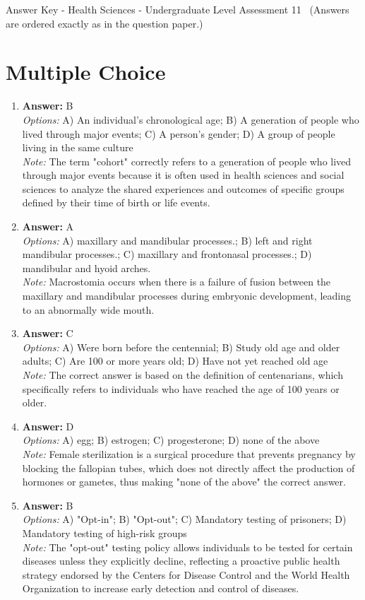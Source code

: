 \documentclass[12pt]{article}
\begin{document}
\begin{center}
Answer Key - Health Sciences - Undergraduate Level Assessment 11 \
\small (Answers are ordered exactly as in the question paper.)
\end{center}

\section*{Multiple Choice}
\begin{enumerate}[label=\arabic*.]
\item \textbf{Answer:} B
\\ \textit{Options:} A) An individual's chronological age; B) A generation of people who lived through major events; C) A person's gender; D) A group of people living in the same culture
\\ \textit{Note:} The term "cohort" correctly refers to a generation of people who lived through major events because it is often used in health sciences and social sciences to analyze the shared experiences and outcomes of specific groups defined by their time of birth or life events.
\item \textbf{Answer:} A
\\ \textit{Options:} A) maxillary and mandibular processes.; B) left and right mandibular processes.; C) maxillary and frontonasal processes.; D) mandibular and hyoid arches.
\\ \textit{Note:} Macrostomia occurs when there is a failure of fusion between the maxillary and mandibular processes during embryonic development, leading to an abnormally wide mouth.
\item \textbf{Answer:} C
\\ \textit{Options:} A) Were born before the centennial; B) Study old age and older adults; C) Are 100 or more years old; D) Have not yet reached old age
\\ \textit{Note:} The correct answer is based on the definition of centenarians, which specifically refers to individuals who have reached the age of 100 years or older.
\item \textbf{Answer:} D
\\ \textit{Options:} A) egg; B) estrogen; C) progesterone; D) none of the above
\\ \textit{Note:} Female sterilization is a surgical procedure that prevents pregnancy by blocking the fallopian tubes, which does not directly affect the production of hormones or gametes, thus making "none of the above" the correct answer.
\item \textbf{Answer:} B
\\ \textit{Options:} A) "Opt-in"; B) "Opt-out"; C) Mandatory testing of prisoners; D) Mandatory testing of high-risk groups
\\ \textit{Note:} The "opt-out" testing policy allows individuals to be tested for certain diseases unless they explicitly decline, reflecting a proactive public health strategy endorsed by the Centers for Disease Control and the World Health Organization to increase early detection and control of diseases.
\end{enumerate}
\end{document}
